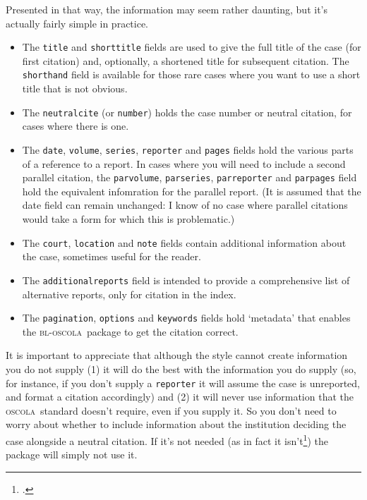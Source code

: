 \documentclass[a4paper,
               11pt,
	       DIV=1,			   
	       footinclude=false]
	      {scrartcl}
\newcommand{\oscola}{\textsc{bl-oscola}}
\newcommand{\oscolashort}{\textsc{oscola}\nocite{oscola}}
\begin{document}
Presented in that way, the information may seem rather daunting, but
it's actually fairly simple in practice.
\begin{itemize}
\item The \texttt{title} and \texttt{shorttitle} fields are used to
  give the full title of the case (for first citation) and,
  optionally, a shortened title for subsequent citation. The
  \texttt{shorthand} field is available for those rare cases where you
  want to use a short title that is not obvious.
\item The \texttt{neutralcite} (or \texttt{number}) holds the case
number or neutral citation, for cases where
  there is one.
\item The \texttt{date}, \texttt{volume}, \texttt{series},
  \texttt{reporter} and \texttt{pages} fields hold the various
  parts of a reference to a report. In cases where you will need to
  include a second parallel citation, the \texttt{parvolume},
  \texttt{parseries}, \texttt{parreporter} and \texttt{parpages} field
  hold the equivalent infomration for the parallel report. (It is
  assumed that the date field can remain unchanged: I know of no case
  where parallel citations would take a form for which this is problematic.)
\item The \texttt{court}, \texttt{location} and \texttt{note} fields contain
  additional information about the case, sometimes useful for the
  reader.
\item The \texttt{additionalreports} field is intended to provide a
comprehensive list of alternative reports, only for citation in the index.
\item The \texttt{pagination}, \texttt{options} and \texttt{keywords}
  fields hold `metadata' that enables the \oscola\ package to get the
  citation correct.
\end{itemize}

It is important to appreciate that although the style cannot create
information you do not supply (1) it will do the best with the
information you do supply (so, for instance, if you don't supply a
\texttt{reporter} it will assume the case is unreported, and
format a citation accordingly) and (2) it will never use information
that the \oscolashort\ standard doesn't require, even if you
supply it. So you don't need to worry about whether to include
information about the institution deciding the case alongside a
neutral citation. If it's not needed (as in fact it
isn't\footcite[16]{oscola}) the package will simply not use it.
\end{document}
